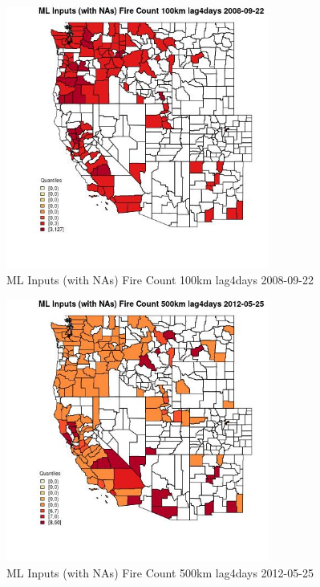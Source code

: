 \begin{figure} 
\centering  
\includegraphics[width=0.77\textwidth]{Code_Outputs/Report_ML_input_PM25_Step4_part_e_de_duplicated_aves_compiled_2019-05-18wNAs_CountyFire_Count_100km_lag4daysMean2008-09-22_2008-09-22.jpg} 
\caption{\label{fig:Report_ML_input_PM25_Step4_part_e_de_duplicated_aves_compiled_2019-05-18wNAsCountyFire_Count_100km_lag4daysMean2008-09-22_2008-09-22}ML Inputs (with NAs) Fire Count 100km lag4days 2008-09-22} 
\end{figure} 
 

\clearpage 

\begin{figure} 
\centering  
\includegraphics[width=0.77\textwidth]{Code_Outputs/Report_ML_input_PM25_Step4_part_e_de_duplicated_aves_compiled_2019-05-18wNAs_CountyFire_Count_500km_lag4daysMean2012-05-25_2012-05-25.jpg} 
\caption{\label{fig:Report_ML_input_PM25_Step4_part_e_de_duplicated_aves_compiled_2019-05-18wNAsCountyFire_Count_500km_lag4daysMean2012-05-25_2012-05-25}ML Inputs (with NAs) Fire Count 500km lag4days 2012-05-25} 
\end{figure} 
 

